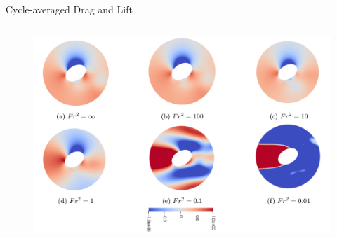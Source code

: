 \documentclass[aspectratio=169,xcolor=dvipsnames]{beamer}
\begin{document}
\begin{frame}{Cycle-averaged Drag and Lift}
\begin{columns}[c]
        \begin{figure}
            \includegraphics[width=.6\textwidth]{figures/pres_1p5.png}
        \end{figure}
    \end{columns}
\end{frame}

\end{document}
